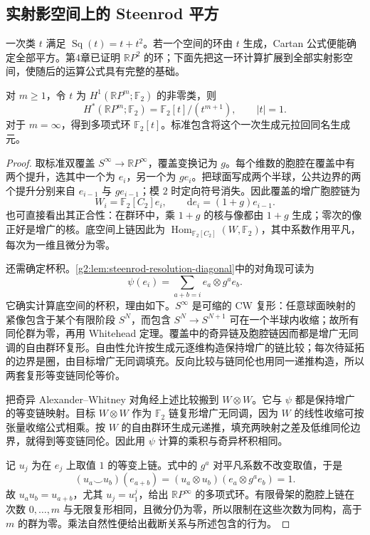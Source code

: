 \subsection{实射影空间上的 Steenrod 平方}
\label{g2:subsec:1303:04}

一次类 \(t\) 满足 \(\operatorname{Sq}(t)=t+t^2\)。若一个空间的环由 \(t\) 生成，Cartan 公式便能确定全部平方。第4章已证明 \(\mathbb RP^2\) 的环；下面先把这一环计算扩展到全部实射影空间，使随后的运算公式具有完整的基础。

\begin{theorem}\label{g2:thm:real-projective-mod-two-ring}
	对 \(m\ge1\)，令 \(t\) 为 \(H^1(\mathbb RP^m;\mathbb F_2)\) 的非零类，则
	\[
		H^*(\mathbb RP^m;\mathbb F_2)=\mathbb F_2[t]/(t^{m+1}),\qquad |t|=1.
	\]
	对于 \(m=\infty\)，得到多项式环 \(\mathbb F_2[t]\)。标准包含将这个一次生成元拉回同名生成元。
\end{theorem}
\begin{proof}
	取标准双覆盖 \(S^\infty\to\mathbb RP^\infty\)，覆盖变换记为 \(g\)。每个维数的胞腔在覆盖中有两个提升，选其中一个为 \(e_i\)，另一个为 \(ge_i\)。把球面写成两个半球，公共边界的两个提升分别来自 \(e_{i-1}\) 与 \(ge_{i-1}\)；模 \(2\) 时定向符号消失。因此覆盖的增广胞腔链为
	\[
		W_i=\mathbb F_2[C_2]e_i,\qquad \mathrm d e_i=(1+g)e_{i-1}.
	\]
	也可直接看出其正合性：在群环中，乘 \(1+g\) 的核与像都由 \(1+g\) 生成；零次的像正好是增广的核。底空间上链因此为 \(\operatorname{Hom}_{\mathbb F_2[C_2]}(W,\mathbb F_2)\)，其中系数作用平凡，每次为一维且微分为零。

	还需确定杯积。\cref{g2:lem:steenrod-resolution-diagonal}中的对角现可读为
	\[
		\psi(e_i)=\sum_{a+b=i}e_a\otimes g^a e_b.
	\]
	它确实计算底空间的杯积，理由如下。\(S^\infty\) 是可缩的 CW 复形：任意球面映射的紧像包含于某个有限阶段 \(S^N\)，而包含 \(S^N\to S^{N+1}\) 可在一个半球内收缩；故所有同伦群为零，再用 Whitehead 定理。覆盖中的奇异链及胞腔链因而都是增广无同调的自由群环复形。自由性允许按生成元逐维构造保持增广的链比较；每次待延拓的边界是圈，由目标增广无同调填充。反向比较与链同伦也用同一递推构造，所以两套复形等变链同伦等价。

	把奇异 Alexander--Whitney 对角经上述比较搬到 \(W\otimes W\)。它与 \(\psi\) 都是保持增广的等变链映射。目标 \(W\otimes W\) 作为 \(\mathbb F_2\) 链复形增广无同调，因为 \(W\) 的线性收缩可按张量收缩公式相乘。按 \(W\) 的自由群环生成元递推，填充两映射之差及低维同伦边界，就得到等变链同伦。因此用 \(\psi\) 计算的乘积与奇异杯积相同。

	记 \(u_j\) 为在 \(e_j\) 上取值 \(1\) 的等变上链。式中的 \(g^a\) 对平凡系数不改变取值，于是
	\[
		(u_a\smile u_b)(e_{a+b})=(u_a\otimes u_b)(e_a\otimes g^a e_b)=1.
	\]
	故 \(u_a u_b=u_{a+b}\)，尤其 \(u_j=u_1^j\)，给出 \(\mathbb RP^\infty\) 的多项式环。有限骨架的胞腔上链在次数 \(0,\ldots,m\) 与无限复形相同，且微分仍为零，所以限制在这些次数为同构，高于 \(m\) 的群为零。乘法自然性便给出截断关系与所述包含的行为。
\end{proof}


